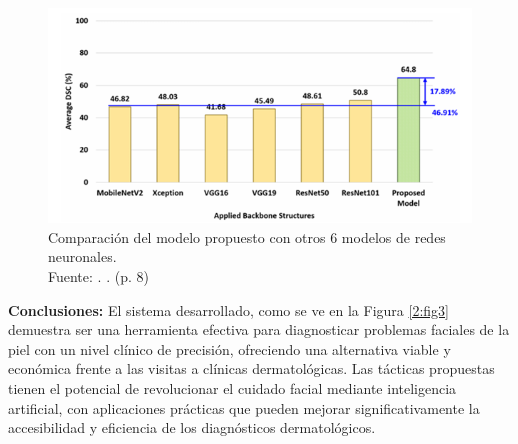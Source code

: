 \begin{figure}[!ht]
	\begin{center}
		\includegraphics[width=1\textwidth]{2/figures/resultados de cuarto anteedente.png}
		\caption[Comparación del modelo propuesto con otros 6 modelos de redes neuronales]{Comparación del modelo propuesto con otros 6 modelos de redes neuronales.\\
			Fuente: \cite{Kim2023}. . (p. 8)}
		\label{2:fig2}
	\end{center}
\end{figure}

\textbf{Conclusiones:}
El sistema desarrollado, como se ve en la Figura \ref{2:fig3} demuestra ser una herramienta efectiva para diagnosticar problemas faciales de la piel con un nivel clínico de precisión, ofreciendo una alternativa viable y económica frente a las visitas a clínicas dermatológicas. Las tácticas propuestas tienen el potencial de revolucionar el cuidado facial mediante inteligencia artificial, con aplicaciones prácticas que pueden mejorar significativamente la accesibilidad y eficiencia de los diagnósticos dermatológicos.

